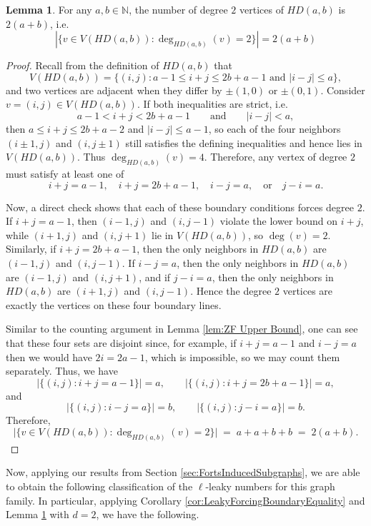 \documentclass[11pt]{article}
\theoremstyle{plain} \newtheorem{question}{Question}
\theoremstyle{definition}
\newtheorem{lem}[thm]{Lemma}
\begin{document}
\begin{lem}\label{lem:degtwoverts}
    For any $a,b\in\mathbb{N}$, the number of degree $2$ vertices of $HD(a,b)$ is $2(a+b)$, i.e. \[|\{v \in V(HD(a,b)) : \deg_{HD(a,b)}(v) = 2\}| = 2(a+b)\]
\end{lem}

\begin{proof}
Recall from the definition of $HD(a,b)$ that
\[
V(HD(a,b))=\{(i,j): a-1\le i+j\le 2b+a-1 \text{ and } |i-j|\le a\},
\]
and two vertices are adjacent when they differ by $\pm(1,0)$ or $\pm(0,1)$. Consider $v=(i,j)\in V(HD(a,b))$. If both inequalities are strict, i.e.
\[
a-1<i+j<2b+a-1 \qquad\text{and}\qquad |i-j|<a,
\]
then $a\le i+j\le 2b+a-2$ and $|i-j|\le a-1$, so each of the four neighbors
$(i\pm1,j)$ and $(i,j\pm1)$ still satisfies the defining inequalities and hence lies in $V(HD(a,b))$. Thus $\deg_{HD(a,b)}(v)=4$. Therefore, any vertex of degree $2$ must satisfy at least one of
\[
i+j=a-1,\quad i+j=2b+a-1,\quad i-j=a,\quad \text{or}\quad j-i=a.
\]

Now, a direct check shows that each of these boundary conditions forces degree $2$.
If $i+j=a-1$, then $(i-1,j)$ and $(i,j-1)$ violate the lower bound on $i+j$, while $(i+1,j)$ and $(i,j+1)$ lie in $V(HD(a,b))$, so $\deg(v)=2$. Similarly, if $i+j=2b+a-1$, then the only neighbors in $HD(a,b)$ are $(i-1,j)$ and $(i,j-1)$. If $i-j=a$, then the only neighbors in $HD(a,b)$ are $(i-1,j)$ and $(i,j+1)$, and if $j-i=a$, then the only neighbors in $HD(a,b)$ are $(i+1,j)$ and $(i,j-1)$. Hence the degree $2$ vertices are exactly the vertices on these four boundary lines.

Similar to the counting argument in Lemma \ref{lem:ZF Upper Bound}, one can see that these four sets are disjoint since, for example, if $i+j=a-1$ and $i-j=a$ then we would have $2i=2a-1$, which is impossible, so we may count them separately. Thus, we have
\[
|\{(i,j): i+j=a-1\}|=a,\qquad |\{(i,j): i+j=2b+a-1\}|=a,
\]
and
\[
|\{(i,j): i-j=a\}|=b,\qquad |\{(i,j): j-i=a\}|=b.
\]
Therefore,
\[
\bigl|\{v\in V(HD(a,b)):\deg_{HD(a,b)}(v)=2\}\bigr| \;=\; a+a+b+b \;=\; 2(a+b).
\]

\end{proof}


Now, applying our results from Section \ref{sec:FortsInducedSubgraphs}, we are able to obtain the following classification of the $\ell$-leaky numbers for this graph family. In particular, applying Corollary \ref{cor:LeakyForcingBoundaryEquality} and Lemma \ref{lem:degtwoverts} with $d= 2$, we have the following. 
\end{document}
